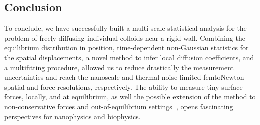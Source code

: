 \subsection{Conclusion}
To conclude, we have successfully built a multi-scale statistical analysis for the problem of freely diffusing individual colloids near a rigid wall. Combining the equilibrium distribution in position, time-dependent non-Gaussian statistics for the spatial displacements, a novel method to infer local diffusion coefficients, and a multifitting procedure, allowed us to reduce drastically the measurement uncertainties and reach the nanoscale and thermal-noise-limited femtoNewton spatial and force resolutions, respectively. The ability to measure tiny surface forces, locally, and at equilibrium, as well the possible extension of the method to non-conservative forces and out-of-equilibrium settings~\cite{amarouchene_nonequilibrium_2019, mangeat_role_2019}, opens fascinating perspectives for nanophysics and biophysics.

